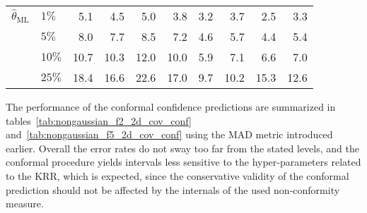 \documentclass[a4paper,14pt]{extarticle}
\begin{document}
\begin{table}
\begin{tabular}{ll||rrrr|rrrr}
  \midrule
  $\hat{\theta}_\text{ML}$ & $1\%$ &      5.1 &      4.5 &      5.0 &      3.8 &      3.2 &      3.7 &      2.5 &      3.3 \\
       & $5\%$ &      8.0 &      7.7 &      8.5 &      7.2 &      4.6 &      5.7 &      4.4 &      5.4 \\
       & $10\%$ &     10.7 &     10.3 &     12.0 &     10.0 &      5.9 &      7.1 &      6.6 &      7.0 \\
       & $25\%$ &     18.4 &     16.6 &     22.6 &     17.0 &      9.7 &     10.2 &     15.3 &     12.6 \\
  \bottomrule
  \end{tabular}
\end{table}

The performance of the conformal confidence predictions are summarized in tables~\ref{tab:nongaussian_f2_2d_cov_conf}
and~\ref{tab:nongaussian_f5_2d_cov_conf} using the MAD metric introduced earlier.
Overall the error rates do not sway too far from the stated levels, and the conformal
procedure yields intervals less sensitive to the hyper-parameters related to the KRR,
which is expected, since the conservative validity of the conformal prediction should
not be affected by the internals of the used non-conformity measure.
\end{document}
